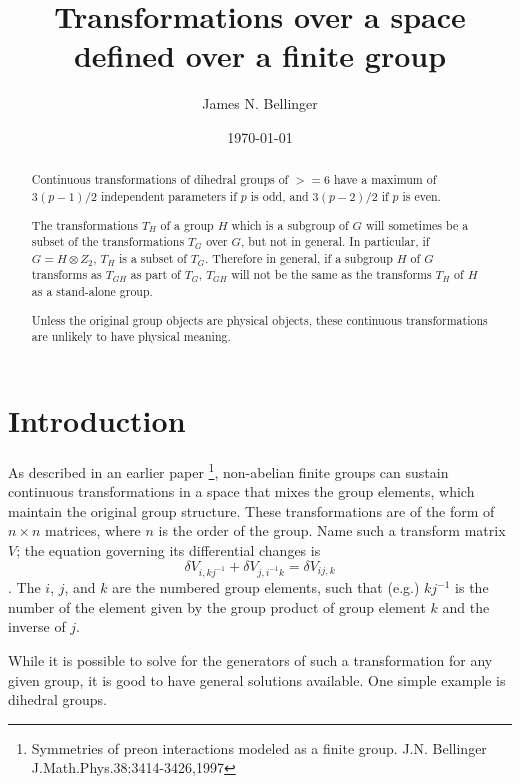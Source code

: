 \documentclass{revtex4-1}
\begin{document}
\title{ Transformations over a space defined over a finite group}
\author{James N. Bellinger}
\date{\today}


\begin{abstract}
Continuous transformations of dihedral groups of $>=6$ have a maximum of $3(p-1)/2$ independent parameters if $p$ is odd, and $3(p-2)/2$ if $p$ is even.
\par The transformations $T_H$ of a group $H$ which is a subgroup of $G$ 
will sometimes be a subset of the transformations $T_G$ over $G$,
but not in general.  In particular, if $G = H \otimes Z_2$, $T_H$
is a subset of $T_G$.  Therefore in general, if a subgroup $H$ of $G$
transforms as $T_{GH}$ as part of $T_G$, $T_{GH}$ will not be the same as
the transforms $T_H$ of $H$ as a stand-alone group.
\par Unless the original group objects are physical objects,
these continuous transformations are unlikely to have physical meaning.
\end{abstract}
\maketitle


\section{Introduction}
As described in an earlier paper \footnote{Symmetries of preon interactions modeled as a finite group. J.N. Bellinger J.Math.Phys.38:3414-3426,1997}, non-abelian finite groups can sustain
continuous transformations in a space that mixes the group elements, which maintain the original
group structure.  These transformations are of the form of $n \times n$ matrices, where $n$ is the
order of the group.  Name such a transform matrix $V$; the equation governing its differential
changes is $$\delta V_{i,kj^{-1}} + \delta V_{j,i^{-1}k} = \delta V_{ij,k}$$.  The $i$, $j$, and $k$ are the numbered group elements, such that (e.g.) $kj^{-1}$ is the number of the element given by the group product of group element $k$ and the inverse of $j$.

\par While it is possible to solve for the generators of such a transformation for any given
group, it is good to have general solutions available.  One simple example is dihedral groups.
\end{document}
